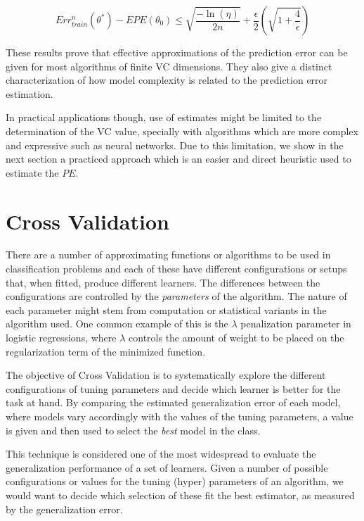 \begin{equation}
Err^n_{train}(\theta^*) - EPE(\theta_0) \leq \sqrt{\frac{-\ln(\eta)}{2n} } + \frac{\epsilon}{2}\left( \sqrt{1 + \frac{4}{\epsilon} } \right)
\end{equation}\label{eq:vapnik-classificationBoundPrecise}

These results prove that effective approximations of the prediction error can be given for most algorithms of finite VC dimensions. They also give a distinct characterization of how model complexity is related to the prediction error estimation.

In practical applications though, use of estimates might be limited to the determination of the VC value, specially with algorithms which are more complex and expressive such as neural networks. Due to this limitation, we show in the next section a practiced approach which is an easier and direct heuristic used to estimate the $PE$.


\section{Cross Validation}\label{section:crossValidation}
 There are a number of approximating functions or algorithms to be used in classification problems and each of these have different configurations or setups that, when fitted, produce different learners. The differences between the configurations are controlled by the \textit{parameters} of the algorithm. The nature of each parameter might stem from computation or statistical variants in the algorithm used. One common example of this is the $\lambda$ penalization parameter in logistic regressions, where $\lambda$ controls the amount of weight to be placed on the regularization term of the minimized function.

The objective of Cross Validation is to systematically explore the different configurations of tuning parameters and decide which learner is better for the task at hand. By comparing the estimated generalization error of each model, where models vary accordingly with the values of the tuning parameters, a value is given and then used to select the \textit{best} model in the class.

This technique is considered one of the most widespread to evaluate the generalization performance of a set of learners. Given a number of possible configurations or values for the tuning (hyper) parameters of an algorithm, we would want to decide which selection of these fit the best estimator, as measured by the generalization error.

